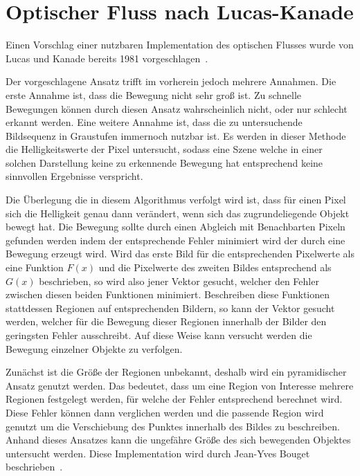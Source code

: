 
\section{Optischer Fluss nach Lucas-Kanade}\label{ch:lucas_kanade}

Einen Vorschlag einer nutzbaren Implementation des optischen Flusses wurde von Lucas und Kanade bereits 1981 vorgeschlagen~\cite{Lucas1981}.

Der vorgeschlagene Ansatz trifft im vorherein jedoch mehrere Annahmen.
Die erste Annahme ist, dass die Bewegung nicht sehr groß ist.
Zu schnelle Bewegungen können durch diesen Ansatz wahrscheinlich nicht, oder nur schlecht erkannt werden.
Eine weitere Annahme ist, dass die zu untersuchende Bildsequenz in Graustufen immernoch nutzbar ist.
Es werden in dieser Methode die Helligkeitswerte der Pixel untersucht, sodass eine Szene welche in einer solchen Darstellung keine zu erkennende Bewegung hat entsprechend keine sinnvollen Ergebnisse verspricht.

Die Überlegung die in diesem Algorithmus verfolgt wird ist, dass für einen Pixel sich die Helligkeit genau dann verändert, wenn sich das zugrundeliegende Objekt bewegt hat.
Die Bewegung sollte durch einen Abgleich mit Benachbarten Pixeln gefunden werden indem der entsprechende Fehler minimiert wird der durch eine Bewegung erzeugt wird.
Wird das erste Bild für die entsprechenden Pixelwerte als eine Funktion $F(x)$ und die Pixelwerte des zweiten Bildes entsprechend als $G(x)$ beschrieben, so wird also jener Vektor gesucht, welcher den Fehler zwischen diesen beiden Funktionen minimiert.
Beschreiben diese Funktionen stattdessen Regionen auf entsprechenden Bildern, so kann der Vektor gesucht werden, welcher für die Bewegung dieser Regionen innerhalb der Bilder den geringsten Fehler ausschreibt.
Auf diese Weise kann versucht werden die Bewegung einzelner Objekte zu verfolgen.

Zunächst ist die Größe der Regionen unbekannt, deshalb wird ein pyramidischer Ansatz genutzt werden.
Das bedeutet, dass um eine Region von Interesse mehrere Regionen festgelegt werden, für welche der Fehler entsprechend berechnet wird.
Diese Fehler können dann verglichen werden und die passende Region wird genutzt um die Verschiebung des Punktes innerhalb des Bildes zu beschreiben.
Anhand dieses Ansatzes kann die ungefähre Größe des sich bewegenden Objektes untersucht werden.
Diese Implementation wird durch Jean-Yves Bouget beschrieben~\cite{Bouguet2000}.

